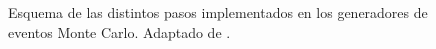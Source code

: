 








\begin{figure}[!htbp]
  \centering

  \scalebox{0.9}{}

  \caption{Esquema de las distintos pasos implementados en los generadores de
    eventos Monte Carlo. Adaptado de \cite{Baer:2009tk}.}
  \label{fig:mc_event_generator}

\end{figure}


